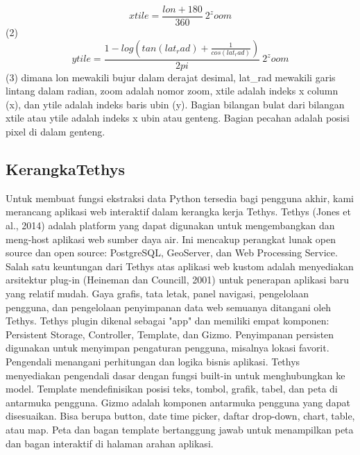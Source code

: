 \begin{equation}
	    xtile = \frac{lon + 180}{360} \ 2^zoom 
\end{equation}
(2)
\begin{equation}
	    ytile =\frac{1-log (tan(lat_rad) + \frac{1}{cos(lat_rad)})}{2pi} \ 2^zoom 
\end{equation}
(3)
dimana lon mewakili bujur dalam derajat desimal, lat_rad mewakili garis lintang dalam radian, zoom adalah nomor zoom, xtile adalah 
indeks x column (x), dan ytile adalah indeks baris ubin (y). Bagian bilangan bulat dari bilangan xtile atau ytile adalah indeks x ubin 
atau genteng. Bagian pecahan adalah posisi pixel di dalam genteng. \cite{Kadlec2016Extracting} 

\subsection{KerangkaTethys}

Untuk membuat fungsi ekstraksi data Python tersedia bagi pengguna akhir, kami merancang aplikasi web interaktif dalam kerangka kerja 
Tethys. Tethys (Jones et al., 2014) adalah platform yang dapat digunakan untuk mengembangkan dan meng-host aplikasi web sumber daya air. 
Ini mencakup perangkat lunak open source dan open source: PostgreSQL, GeoServer, dan Web Processing Service. Salah satu keuntungan dari 
Tethys atas aplikasi web kustom adalah menyediakan arsitektur plug-in (Heineman dan Councill, 2001) untuk penerapan aplikasi baru yang 
relatif mudah. Gaya grafis, tata letak, panel navigasi, pengelolaan pengguna, dan pengelolaan penyimpanan data web semuanya ditangani 
oleh Tethys. Tethys plugin dikenal sebagai "app" dan memiliki empat komponen: Persistent Storage, Controller, Template, dan Gizmo. 
Penyimpanan persisten digunakan untuk menyimpan pengaturan pengguna, misalnya lokasi favorit. Pengendali menangani perhitungan dan 
logika bisnis aplikasi. Tethys menyediakan pengendali dasar dengan fungsi built-in untuk menghubungkan ke model. Template mendefinisikan 
posisi teks, tombol, grafik, tabel, dan peta di antarmuka pengguna. Gizmo adalah komponen antarmuka pengguna yang dapat disesuaikan. 
Bisa berupa button, date time picker, daftar drop-down, chart, table, atau map. Peta dan bagan template bertanggung jawab untuk 
menampilkan peta dan bagan interaktif di halaman arahan aplikasi.

\cite{Kadlec2016Extracting}


